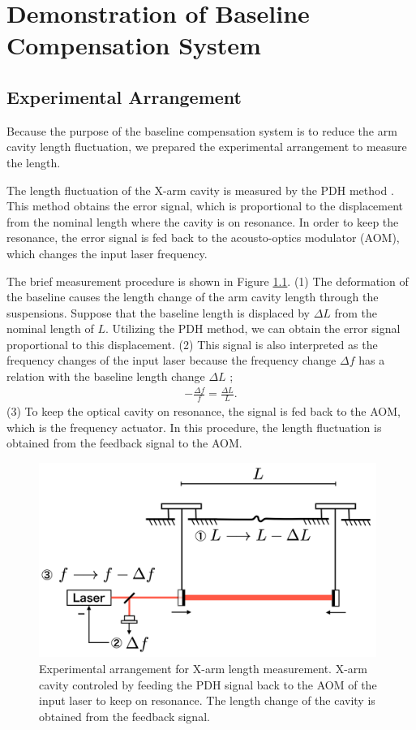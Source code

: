 \chapter{Demonstration of Baseline Compensation System} \label{chap5}

\section{Experimental Arrangement} \label{sec:sec51}
Because the purpose of the baseline compensation system is to reduce the arm cavity length fluctuation, we prepared the experimental arrangement to measure the length.


The length fluctuation of the X-arm cavity is measured by the PDH method \cite{drever1983laser}. This method obtains the error signal, which is proportional to the displacement from the nominal length where the cavity is on resonance. In order to keep the resonance, the error signal is fed back to the acousto-optics modulator (AOM), which changes the input laser frequency.

The brief measurement procedure is shown in Figure \ref{img:img600}. (1) The deformation of the baseline causes the length change of the arm cavity length through the suspensions. Suppose that the baseline length is displaced by $\Delta{L}$ from the nominal length
of $L$. Utilizing the PDH method, we can obtain the error signal proportional to this displacement. (2) This signal is also interpreted as the frequency changes of the input laser because the frequency change $\Delta{f}$ has a relation with the baseline length change $\Delta{L}$ \cite{izumi2012multi};
\begin{eqnarray}
  \displaystyle -\frac{\Delta{f}}{f} = \frac{\Delta{L}}{L}.
\end{eqnarray}
(3) To keep the optical cavity on resonance, the signal is fed back to the AOM, which is the frequency actuator. In this procedure, the length fluctuation is obtained from the feedback signal to the AOM.
\begin{figure}[h]
  \centering
  \includegraphics[width=11cm]{./img_chap6/img600.png}
  \caption{Experimental arrangement for X-arm length measurement. X-arm cavity controled by feeding the PDH signal back to the AOM of the input laser to keep on resonance. The length change of the cavity is obtained from the feedback signal.}
  \label{img:img600}  
\end{figure}


